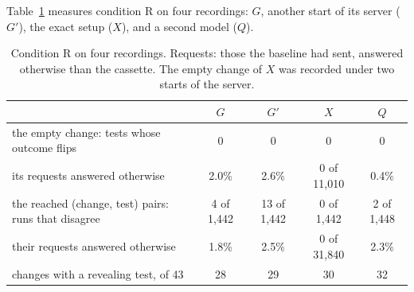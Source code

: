 \documentclass[11pt,a4paper]{article}
\begin{document}
Table~\ref{tab:condition} measures condition R on four recordings: $G$, another start of its server ($G'$), the
exact setup ($X$), and a second model ($Q$).

\begin{table}[H]
\centering\small
\caption{Condition R on four recordings. Requests: those the baseline had sent, answered otherwise than the
cassette. The empty change of $X$ was recorded under two starts of the server.}
\label{tab:condition}
\setlength{\tabcolsep}{5pt}
\begin{tabular}{lcccc}
\toprule
 & $G$ & $G'$ & $X$ & $Q$ \\
\midrule
the empty change: tests whose outcome flips & 0 & 0 & 0 & 0 \\
\quad its requests answered otherwise & 2.0\% & 2.6\% & 0 of 11,010 & 0.4\% \\
the reached (change, test) pairs: runs that disagree & 4 of 1,442 & 13 of 1,442 & 0 of 1,442 & 2 of 1,448 \\
\quad their requests answered otherwise & 1.8\% & 2.5\% & 0 of 31,840 & 2.3\% \\
changes with a revealing test, of 43 & 28 & 29 & 30 & 32 \\
\bottomrule
\end{tabular}
\end{table}
\end{document}
